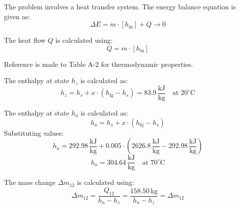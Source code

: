 The problem involves a heat transfer system. The energy balance equation is given as:  
\[
\Delta E = \dot{m} \cdot [h_{\text{in}}] + Q \rightarrow 0
\]  

The heat flow \( Q \) is calculated using:  
\[
Q = \dot{m} \cdot [h_{\text{in}}]
\]  

Reference is made to Table A-2 for thermodynamic properties.  

The enthalpy at state \( h_z \) is calculated as:  
\[
h_z = h_s + x \cdot (h_{\text{fg}} - h_s) = 83.9 \, \frac{\text{kJ}}{\text{kg}} \quad \text{at } 20^\circ\text{C}
\]  

The enthalpy at state \( h_a \) is calculated as:  
\[
h_a = h_s + x \cdot (h_{\text{fg}} - h_s)
\]  
Substituting values:  
\[
h_a = 292.98 \, \frac{\text{kJ}}{\text{kg}} + 0.005 \cdot (2626.8 \, \frac{\text{kJ}}{\text{kg}} - 292.98 \, \frac{\text{kJ}}{\text{kg}})
\]  
\[
h_a = 304.64 \, \frac{\text{kJ}}{\text{kg}} \quad \text{at } 70^\circ\text{C}
\]  

The mass change \( \Delta m_{12} \) is calculated using:  
\[
\Delta m_{12} = \frac{Q_{12}}{h_a - h_z} = \frac{158.50 \, \text{kg}}{h_a - h_z} = \Delta m_{12}
\]
